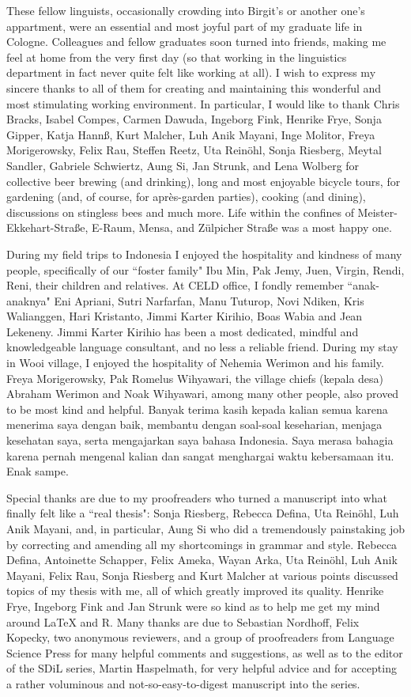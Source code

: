 These fellow linguists, occasionally crowding into Birgit's or another one's appartment, were an essential and most joyful part of my graduate life in Cologne. Colleagues and fellow graduates soon turned into friends, making me feel at home from the very first day (so that working in the linguistics department in fact never quite felt like working at all). I wish to express my sincere thanks to all of them for creating and maintaining this wonderful and most stimulating working environment. In particular, I would like to thank Chris Bracks, Isabel Compes, Carmen Dawuda, Ingeborg Fink, Henrike Frye, Sonja Gipper, Katja Hannß, Kurt Malcher, Luh Anik Mayani, Inge Molitor, Freya Morigerowsky, Felix Rau, Steffen Reetz, Uta Reinöhl, Sonja Riesberg, Meytal Sandler, Gabriele Schwiertz, Aung Si, Jan Strunk, and Lena Wolberg for collective beer brewing (and drinking), long and most enjoyable bicycle tours, for gardening (and, of course, for après-garden parties), cooking (and dining), discussions on stingless bees and much more. Life within the confines of Meister-Ekkehart-Straße, E-Raum, Mensa, and Zülpicher Straße was a most happy one.

During my field trips to Indonesia I enjoyed the hospitality and kindness of many people, specifically of our ``foster family" Ibu Min, Pak Jemy, Juen, Virgin, Rendi, Reni, their children and relatives. At CELD office, I fondly remember ``anak-anaknya" Eni Apriani, Sutri Narfarfan, Manu Tuturop, Novi Ndiken, Kris Walianggen, Hari Kristanto, Jimmi Karter Kirihio, Boas Wabia and Jean Lekeneny. Jimmi Karter Kirihio has been a most dedicated, mindful and knowledgeable language consultant, and no less a reliable friend. During my stay in Wooi village, I enjoyed the hospitality of Nehemia Werimon and his family. Freya Morigerowsky, Pak Romelus Wihyawari, the village chiefs (kepala desa) Abraham Werimon and Noak Wihyawari, among many other people, also proved to be most kind and helpful. Banyak terima kasih kepada kalian semua karena menerima saya dengan baik, membantu dengan soal-soal keseharian, menjaga kesehatan saya, serta mengajarkan saya bahasa Indonesia. Saya merasa bahagia karena pernah mengenal kalian dan sangat menghargai waktu kebersamaan itu. Enak sampe.

Special thanks are due to my proofreaders who turned a manuscript into what finally felt like a ``real thesis": Sonja Riesberg, Rebecca Defina, Uta Reinöhl, Luh Anik Mayani, and, in particular, Aung Si who did a tremendously painstaking job by correcting and amending all my shortcomings in grammar and style. Rebecca Defina, Antoinette Schapper, Felix Ameka, Wayan Arka, Uta Reinöhl, Luh Anik Mayani, Felix Rau, Sonja Riesberg and Kurt Malcher at various points discussed topics of my thesis with me, all of which greatly improved its quality. Henrike Frye, Ingeborg Fink and Jan Strunk were so kind as to help me get my mind around LaTeX and R. Many thanks are due to Sebastian Nordhoff, Felix Kopecky, two anonymous reviewers, and a group of proofreaders from Language Science Press for many helpful comments and suggestions, as well as to the editor of the SDiL series, Martin Haspelmath, for very helpful advice and for accepting a rather voluminous and not-so-easy-to-digest manuscript into the series.

